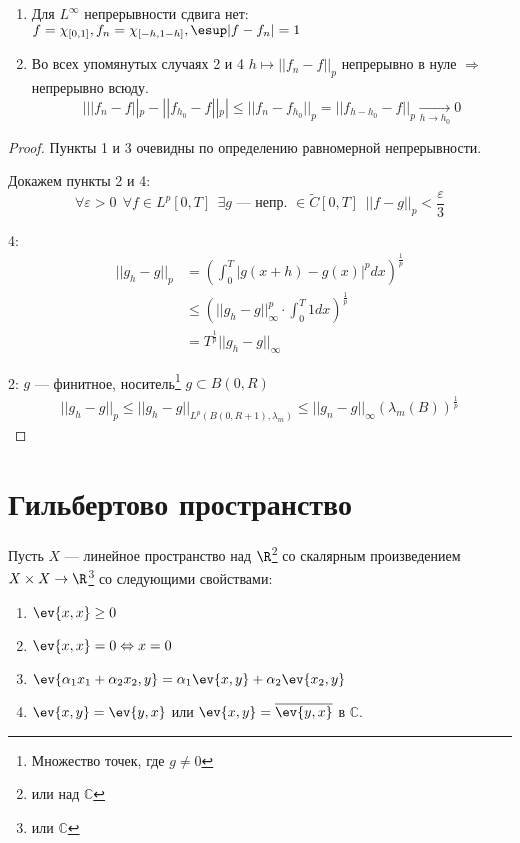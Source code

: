 \begin{remark}\itemfix
    \begin{enumerate}
        \item Для \(L^{\infty}\) непрерывности сдвига нет: \(f = \chi_{[0, 1]}, f_n = \chi_{[ - h, 1 - h]}, \esup |f - f_n| = 1\)
        \item Во всех упомянутых случаях 2 и 4 \(h \mapsto ||f_n - f||_p\) непрерывно в нуле \( \Rightarrow \) непрерывно всюду.
              \[| ||f_n - f||_p - ||f_{h_0} - f||_p | \leq  ||f_n - f_{h_0}||_p = ||f_{h - h_0} - f||_p \xrightarrow[h \to h_0]{} 0\]
    \end{enumerate}
\end{remark}

\begin{proof}
    Пункты 1 и 3 очевидны по определению равномерной непрерывности.

    Докажем пункты 2 и 4:
    \[\forall \varepsilon > 0 \ \ \forall f \in L^p[0, T] \ \ \exists g \text{ --- непр. } \in \widetilde{C}[0, T] \ \ ||f - g||_p < \frac{\varepsilon}{3}\]

    4:
    \begin{align*}
        ||g_h - g||_p & = \left( \int_0^T |g(x + h) - g(x)|^p dx \right)^{\frac{1}{p}}               \\
                      & \leq \left( ||g_h - g||_{\infty}^p \cdot \int_0^T 1 dx \right)^{\frac{1}{p}} \\
                      & = T^{\frac{1}{p}} ||g_h - g||_{\infty}
    \end{align*}

    2: \(g\) --- финитное, носитель\footnote{Множество точек, где \(g \neq 0\)} \(g \subset B(0, R)\)
    \begin{align*}
        ||g_h - g||_p \leq ||g_h - g||_{L^p(B(0, R + 1), \lambda_m)} \leq ||g_n - g||_{\infty} (\lambda_m(B))^{\frac{1}{p}}
    \end{align*}
\end{proof}

\section{Гильбертово пространство}

Пусть \(X\) --- линейное пространство над \(\R\)\footnote{или над \(\mathbb{C}\)} со скалярным произведением \(X \times X \to \R\)\footnote{или \(\mathbb{C}\)} со следующими свойствами:
\begin{enumerate}
    \item \(\ev{x, x} \geq 0\)
    \item \(\ev{x, x} = 0 \Leftrightarrow x = 0\)
    \item \(\ev{\alpha_1 x_1 + \alpha_2 x_2, y} = \alpha_1 \ev{x, y} + \alpha_2 \ev{x_2, y}\)
    \item \(\ev{x, y} = \ev{y, x}\) или \(\ev{x, y} = \overline{\ev{y, x}}\) в \(\mathbb{C}\).
\end{enumerate}

